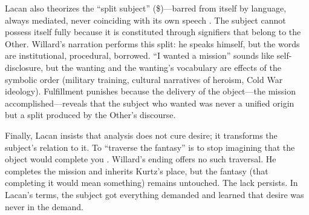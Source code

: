 Lacan also theorizes the ``split subject'' (\$)---barred from itself by language, always
mediated, never coinciding with its own speech \parencite{LacanEcrits2006}. The subject cannot
possess itself fully because it is constituted through signifiers that belong to the Other.
Willard's narration performs this split: he speaks himself, but the words are institutional,
procedural, borrowed. ``I wanted a mission'' sounds like self-disclosure, but the wanting and
the wanting's vocabulary are effects of the symbolic order (military training, cultural
narratives of heroism, Cold War ideology). Fulfillment punishes because the delivery of the
object---the mission accomplished---reveals that the subject who wanted was never a unified
origin but a split produced by the Other's discourse.

Finally, Lacan insists that analysis does not cure desire; it transforms the subject's relation
to it. To ``traverse the fantasy'' is to stop imagining that the object would complete you
\parencite{LacanSeminarXI1991}. Willard's ending offers no such traversal. He completes the
mission and inherits Kurtz's place, but the fantasy (that completing it would mean something)
remains untouched. The lack persists. In Lacan's terms, the subject got everything demanded
and learned that desire was never in the demand.
